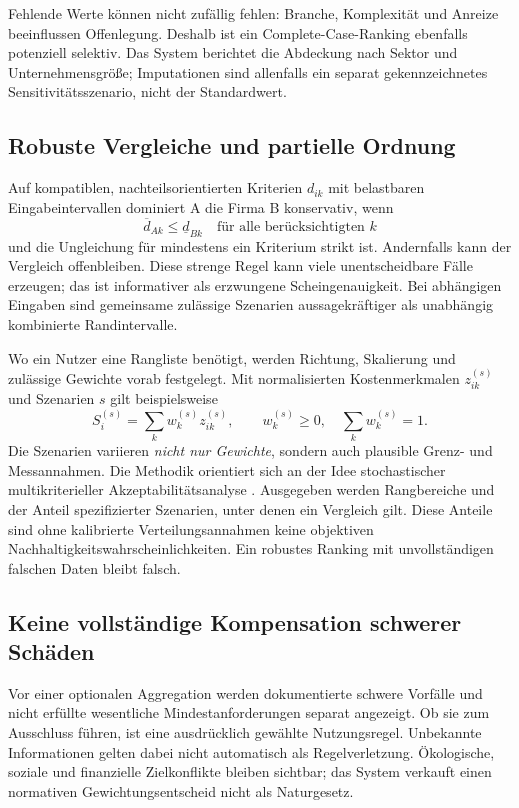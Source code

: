 \documentclass[11pt,a4paper]{article}
\begin{document}
Fehlende Werte können nicht zufällig fehlen: Branche, Komplexität und Anreize beeinflussen Offenlegung. Deshalb ist ein Complete-Case-Ranking ebenfalls potenziell selektiv. Das System berichtet die Abdeckung nach Sektor und Unternehmensgröße; Imputationen sind allenfalls ein separat gekennzeichnetes Sensitivitätsszenario, nicht der Standardwert.

\subsection{Robuste Vergleiche und partielle Ordnung}
Auf kompatiblen, nachteilsorientierten Kriterien $d_{ik}$ mit belastbaren Eingabeintervallen dominiert A die Firma B konservativ, wenn
\begin{equation}
\overline d_{Ak}\leq\underline d_{Bk}\quad\text{für alle berücksichtigten }k
\end{equation}
und die Ungleichung für mindestens ein Kriterium strikt ist. Andernfalls kann der Vergleich offenbleiben. Diese strenge Regel kann viele unentscheidbare Fälle erzeugen; das ist informativer als erzwungene Scheingenauigkeit. Bei abhängigen Eingaben sind gemeinsame zulässige Szenarien aussagekräftiger als unabhängig kombinierte Randintervalle.

Wo ein Nutzer eine Rangliste benötigt, werden Richtung, Skalierung und zulässige Gewichte vorab festgelegt. Mit normalisierten Kostenmerkmalen $z_{ik}^{(s)}$ und Szenarien $s$ gilt beispielsweise
\begin{equation}
S_i^{(s)}=\sum_k w_k^{(s)}z_{ik}^{(s)},\qquad w_k^{(s)}\geq0,\quad\sum_k w_k^{(s)}=1.
\end{equation}
Die Szenarien variieren \emph{nicht nur Gewichte}, sondern auch plausible Grenz- und Messannahmen. Die Methodik orientiert sich an der Idee stochastischer multikriterieller Akzeptabilitätsanalyse \cite{smaa1998}. Ausgegeben werden Rangbereiche und der Anteil spezifizierter Szenarien, unter denen ein Vergleich gilt. Diese Anteile sind ohne kalibrierte Verteilungsannahmen keine objektiven Nachhaltigkeitswahrscheinlichkeiten. Ein robustes Ranking mit unvollständigen falschen Daten bleibt falsch.

\subsection{Keine vollständige Kompensation schwerer Schäden}
Vor einer optionalen Aggregation werden dokumentierte schwere Vorfälle und nicht erfüllte wesentliche Mindestanforderungen separat angezeigt. Ob sie zum Ausschluss führen, ist eine ausdrücklich gewählte Nutzungsregel. Unbekannte Informationen gelten dabei nicht automatisch als Regelverletzung. Ökologische, soziale und finanzielle Zielkonflikte bleiben sichtbar; das System verkauft einen normativen Gewichtungsentscheid nicht als Naturgesetz.
\end{document}
